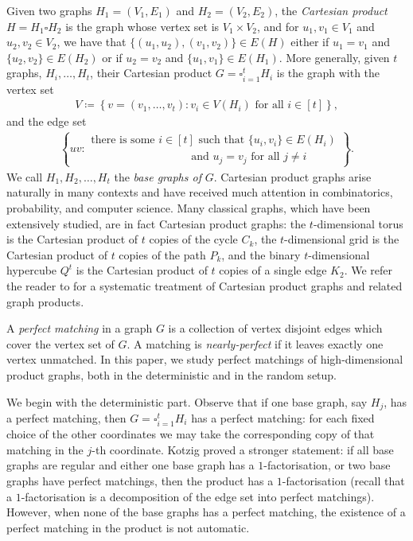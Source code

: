 \documentclass[10pt,a4paper]{article}
\begin{document}
Given two graphs $H_1=(V_1,E_1)$ and $H_2=(V_2,E_2)$, the \textit{Cartesian product} $H=H_1\square H_2$ is the graph whose vertex set is $V_1\times V_2$, and for $u_1,v_1\in V_1$ and $u_2,v_2\in V_2$, we have that $\{(u_1,u_2),(v_1,v_2)\}\in E(H)$ either if $u_1=v_1$ and $\{u_2,v_2\}\in E(H_2)$ or if $u_2=v_2$ and $\{u_1,v_1\}\in E(H_1)$. More generally, given $t$ graphs, $H_i,\ldots, H_t$, their Cartesian product $G=\square_{i=1}^tH_i$ is the graph with the vertex set
\begin{align*}
    V\coloneqq \left\{v=(v_1,\ldots, v_t)\colon v_i\in V(H_i)\text{ for all } i\in[t]\right\},
\end{align*}
and the edge set
\begin{align*}
  \left\{uv \colon \begin{array}{l} \text{there is some } i\in [t] \text{ such that }  \{u_i,v_i\}\in E\left(H_i\right)\\
   \qquad\qquad\qquad\quad\qquad \text{and } u_j=v_j \text{ for all } j \neq i \end{array}\right\}.
\end{align*}
We call $H_1,H_2,\ldots, H_t$ the \textit{base graphs of} $G$. Cartesian product graphs arise naturally in many contexts and have received much attention in combinatorics, probability, and computer science. Many classical graphs, which have been extensively studied, are in fact Cartesian product graphs: the $t$-dimensional torus is the Cartesian product of $t$ copies of the cycle $C_k$, the $t$-dimensional grid is the Cartesian product of $t$ copies of the path $P_k$, and the binary $t$-dimensional hypercube $Q^t$ is the Cartesian product of $t$ copies of a single edge $K_2$.
We refer the reader to \cite{HIK11} for a systematic treatment of Cartesian product graphs and related graph products.

A \emph{perfect matching} in a graph $G$ is a collection of vertex disjoint edges which cover the vertex set of $G$. A matching is \emph{nearly-perfect} if it leaves exactly one vertex unmatched. In this paper, we study perfect matchings of high-dimensional product graphs, both in the deterministic and in the random setup. 

We begin with the deterministic part. Observe that if one base graph, say $H_j$, has a perfect matching, then $G=\square_{i=1}^tH_i$ has a perfect matching: for each fixed choice of the other coordinates we may take the corresponding copy of that matching in the $j$-th coordinate.
Kotzig \cite{K79} proved a stronger statement: if all base graphs are regular and either one base graph has a $1$-factorisation, or two base graphs have perfect matchings, then the product has a $1$-factorisation (recall that a $1$-factorisation is a decomposition of the edge set into perfect matchings).
However, when none of the base graphs has a perfect matching, the existence of a perfect matching in the product is not automatic.
\end{document}

